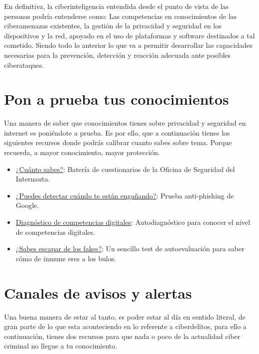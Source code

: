 \documentclass[
  a4paper,
  openany]{book}
\begin{document}
En definitiva, la ciberinteligencia entendida desde el punto de vista de las personas podría entenderse como: Las competencias en conocimientos de las ciberamenazas existentes, la gestión de la privacidad y seguridad en los dispositivos y la red, apoyado en el uso de plataformas y software destinados a tal cometido. Siendo todo lo anterior lo que va a permitir desarrollar las capacidades necesarias para la prevención, detección y reacción adecuada ante posibles ciberataques.

\hypertarget{pon-a-prueba-tus-conocimientos}{%
\section{Pon a prueba tus conocimientos}\label{pon-a-prueba-tus-conocimientos}}

Una manera de saber que conocimientos tienes sobre privacidad y seguridad en internet es poniéndote a prueba. Es por ello, que a continuación tienes los siguientes recursos donde podrás calibrar cuanto sabes sobre tema. Porque recuerda, a mayor conocimiento, mayor protección.

\begin{itemize}
\item
  \href{https://www.osi.es/es/cuanto-sabes}{¿Cuánto sabes?}: Batería de cuestionarios de la Oficina de Seguridad del Internauta.
\item
  \href{https://phishingquiz.withgoogle.com/?hl=es}{¿Puedes detectar cuándo te están engañando?}: Prueba anti-phishing de Google.
\item
  \href{https://www.digcomp.andaluciaesdigital.es/}{Diagnóstico de competencias digitales}: Autodiagnóstico para conocer el nivel de competencias digitales.
\item
  \href{https://www.proyectoescapefake.org/haz-el-test/}{¿Sabes escapar de los fakes?}: Un sencillo test de autoevaluación para saber cómo de inmune eres a los bulos.
\end{itemize}

\hypertarget{canales-de-avisos-y-alertas}{%
\section{Canales de avisos y alertas}\label{canales-de-avisos-y-alertas}}

Una buena manera de estar al tanto, es poder estar al día en sentido literal, de gran parte de lo que esta aconteciendo en lo referente a ciberdelitos, para ello a continuación, tienes dos recursos para que nada o poco de la actualidad ciber criminal no llegue a tu conocimiento.
\end{document}
